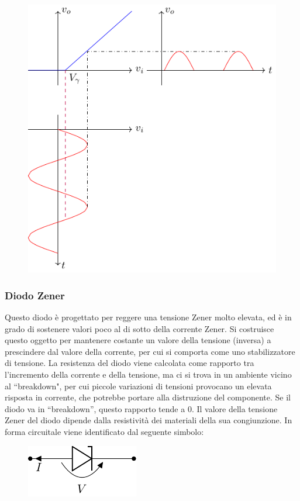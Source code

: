 \documentclass{article}
\numberwithin{equation}{subsection}
\begin{document}
\begin{figure}[H]%
    \centering
    \includegraphics{transcaratteristica-sinusoide.pdf}%
    \label{fig:transcaratteristica-sinusoide}
\end{figure}

\subsubsection{Diodo Zener}

Questo diodo è progettato per reggere una tensione Zener molto elevata, ed è in grado di sostenere valori poco al di sotto della corrente Zener. 
Si costruisce questo oggetto per mantenere costante un valore della tensione (inversa) a prescindere dal valore della corrente, per cui si comporta come uno stabilizzatore di 
tensione. La resistenza del diodo viene calcolata come rapporto tra l'incremento della corrente e della tensione, ma ci si trova in un ambiente vicino al ``breakdown", 
per cui piccole variazioni di tensioni provocano un elevata risposta in corrente, che potrebbe portare alla distruzione del componente. Se il diodo va in ``breakdown'', 
questo rapporto tende a $0$. Il valore della tensione Zener del diodo dipende dalla resistività dei materiali della sua congiunzione. 
In forma circuitale viene identificato dal seguente simbolo:
\begin{figure}[H]%
    \centering
    \includegraphics{diodo-zener.pdf}%
    \label{fig:diodo-zener}
\end{figure}
\end{document}
